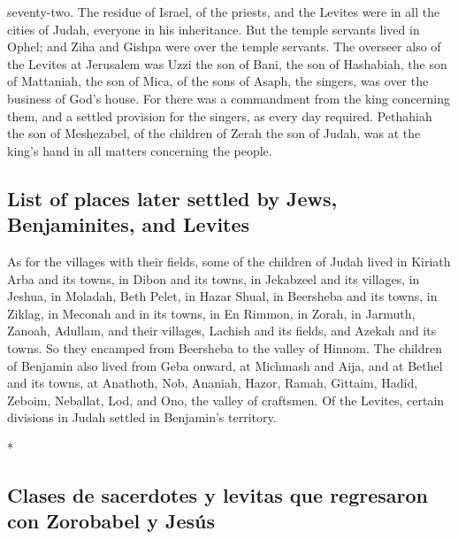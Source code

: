 \begin{paracol}{2}
\begin{otherlanguage}{english}
seventy-two.  The residue of Israel, of the priests, and
the Levites were in all the cities of Judah, everyone in his
inheritance.  But the temple servants lived in Ophel; and
Ziha and Gishpa were over the temple servants.  The
overseer also of the Levites at Jerusalem was Uzzi the son of Bani, the
son of Hashabiah, the son of Mattaniah, the son of Mica, of the sons of
Asaph, the singers, was over the business of God's house.
 For there was a commandment from the king concerning
them, and a settled provision for the singers, as every day required.
 Pethahiah the son of Meshezabel, of the children of
Zerah the son of Judah, was at the king's hand in all matters concerning
the people.

\hypertarget{list-of-places-later-settled-by-jews-benjaminites-and-levites}{%
\subsection{List of places later settled by Jews, Benjaminites, and
Levites}\label{list-of-places-later-settled-by-jews-benjaminites-and-levites}}

 As for the villages with their fields, some of the
children of Judah lived in Kiriath Arba and its towns, in Dibon and its
towns, in Jekabzeel and its villages,  in Jeshua, in
Moladah, Beth Pelet,  in Hazar Shual, in Beersheba and
its towns,  in Ziklag, in Meconah and in its towns,
 in En Rimmon, in Zorah, in Jarmuth, 
Zanoah, Adullam, and their villages, Lachish and its fields, and Azekah
and its towns. So they encamped from Beersheba to the valley of Hinnom.
 The children of Benjamin also lived from Geba onward, at
Michmash and Aija, and at Bethel and its towns,  at
Anathoth, Nob, Ananiah,  Hazor, Ramah, Gittaim,
 Hadid, Zeboim, Neballat,  Lod, and Ono,
the valley of craftsmen.  Of the Levites, certain
divisions in Judah settled in Benjamin's territory.

\end{otherlanguage}

\switchcolumn[0]*

\hypertarget{clases-de-sacerdotes-y-levitas-que-regresaron-con-zorobabel-y-jesuxfas}{%
\subsection{Clases de sacerdotes y levitas que regresaron con Zorobabel
y
Jesús}\label{clases-de-sacerdotes-y-levitas-que-regresaron-con-zorobabel-y-jesuxfas}}


\end{paracol}
